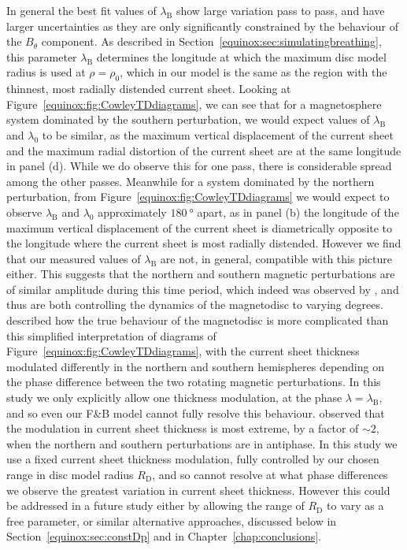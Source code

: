 In general the best fit values of $\lambda_\mathrm{B}$ show large variation pass to pass, and have larger uncertainties as they are only significantly constrained by the behaviour of the $B_{\theta}$ component. As described in Section~\ref{equinox:sec:simulatingbreathing}, this parameter $\lambda_\mathrm{B}$ determines the longitude at which the maximum disc model radius is used at $\rho = \rho_0$, which in our model is the same as the region with the thinnest, most radially distended current sheet. Looking at Figure~\ref{equinox:fig:CowleyTDdiagrams}, we can see that for a magnetosphere system dominated by the southern perturbation, we would expect values of $\lambda_\mathrm{B}$ and $\lambda_\mathrm{0}$ to be similar, as the maximum vertical displacement of the current sheet and the maximum radial distortion of the current sheet are at the same longitude in panel (d). While we do observe this for one pass, there is considerable spread among the other passes. Meanwhile for a system dominated by the northern perturbation, from Figure~\ref{equinox:fig:CowleyTDdiagrams} we would expect to observe $\lambda_\mathrm{B}$ and $\lambda_\mathrm{0}$ approximately $\SI{180}{\degree}$ apart, as in panel (b) the longitude of the maximum vertical displacement of the current sheet is diametrically opposite to the longitude where the current sheet is most radially distended. However we find that our measured values of $\lambda_\mathrm{B}$ are not, in general, compatible with this picture either. This suggests that the northern and southern magnetic perturbations are of similar amplitude during this time period, which indeed was observed by \citet{andrews2012}, and thus are both controlling the dynamics of the magnetodisc to varying degrees. \citet{cowley2017b} described how the true behaviour of the magnetodisc is more complicated than this simplified interpretation of diagrams of Figure~\ref{equinox:fig:CowleyTDdiagrams}, with the current sheet thickness modulated differently in the northern and southern hemispheres depending on the phase difference between the two rotating magnetic perturbations. In this study we only explicitly allow one thickness modulation, at the phase $\lambda = \lambda_\mathrm{B}$, and so even our F{\&}B model cannot fully resolve this behaviour. \citet{provan2012} observed that the modulation in current sheet thickness is most extreme, by a factor of ${\sim}2$, when the northern and southern perturbations are in antiphase. In this study we use a fixed current sheet thickness modulation, fully controlled by our chosen range in disc model radius $R_\mathrm{D}$, and so cannot resolve at what phase differences we observe the greatest variation in current sheet thickness. However this could be addressed in a future study either by allowing the range of $R_\mathrm{D}$ to vary as a free parameter, or similar alternative approaches, discussed below in Section~\ref{equinox:sec:constDp} and in Chapter~\ref{chap:conclusions}.

